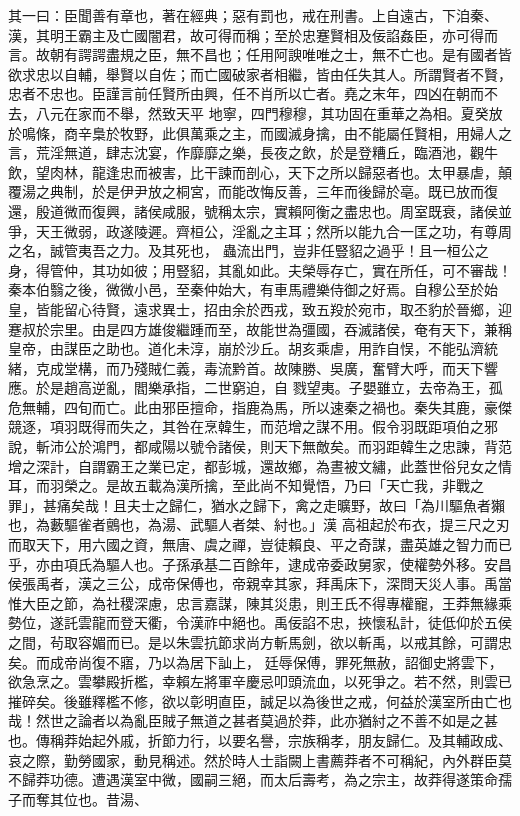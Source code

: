 \begin{pinyinscope}
 其一曰：臣聞善有章也，著在經典；惡有罰也，戒在刑書。上自遠古，下洎秦、漢，其明王霸主及亡國闇君，故可得而稱；至於忠蹇賢相及佞諂姦臣，亦可得而言。故朝有諤諤盡規之臣，無不昌也；任用阿諛唯唯之士，無不亡也。是有國者皆欲求忠以自輔，舉賢以自佐；而亡國破家者相繼，皆由任失其人。所謂賢者不賢，忠者不忠也。臣謹言前任賢所由興，任不肖所以亡者。堯之末年，四凶在朝而不去，八元在家而不舉，然致天平
 地寧，四門穆穆，其功固在重華之為相。夏癸放於鳴條，商辛梟於牧野，此俱萬乘之主，而國滅身擒，由不能屬任賢相，用婦人之言，荒淫無道，肆志沈宴，作靡靡之樂，長夜之飲，於是登糟丘，臨酒池，觀牛飲，望肉林，龍逢忠而被害，比干諫而剖心，天下之所以歸惡者也。太甲暴虐，顛覆湯之典制，於是伊尹放之桐宮，而能改悔反善，三年而後歸於亳。既已放而復還，殷道微而復興，諸侯咸服，號稱太宗，實賴阿衡之盡忠也。周室既衰，諸侯並爭，天王微弱，政遂陵遲。齊桓公，淫亂之主耳；然所以能九合一匡之功，有尊周之名，誠管夷吾之力。及其死也，
 蟲流出門，豈非任豎貂之過乎！且一桓公之身，得管仲，其功如彼；用豎貂，其亂如此。夫榮辱存亡，實在所任，可不審哉！秦本伯翳之後，微微小邑，至秦仲始大，有車馬禮樂侍御之好焉。自穆公至於始皇，皆能留心待賢，遠求異士，招由余於西戎，致五羖於宛市，取丕豹於晉鄉，迎蹇叔於宗里。由是四方雄俊繼踵而至，故能世為彊國，吞滅諸侯，奄有天下，兼稱皇帝，由謀臣之助也。道化未淳，崩於沙丘。胡亥乘虐，用詐自悮，不能弘濟統緒，克成堂構，而乃殘賊仁義，毒流黔首。故陳勝、吳廣，奮臂大呼，而天下響應。於是趙高逆亂，閻樂承指，二世窮迫，自
 戮望夷。子嬰雖立，去帝為王，孤危無輔，四旬而亡。此由邪臣擅命，指鹿為馬，所以速秦之禍也。秦失其鹿，豪傑競逐，項羽既得而失之，其咎在烹韓生，而范增之謀不用。假令羽既距項伯之邪說，斬沛公於鴻門，都咸陽以號令諸侯，則天下無敵矣。而羽距韓生之忠諫，背范增之深計，自謂霸王之業已定，都彭城，還故鄉，為晝被文繡，此蓋世俗兒女之情耳，而羽榮之。是故五載為漢所擒，至此尚不知覺悟，乃曰「天亡我，非戰之罪」，甚痛矣哉！且夫士之歸仁，猶水之歸下，禽之走曠野，故曰「為川驅魚者獺也，為藪驅雀者鸇也，為湯、武驅人者桀、紂也。」漢
 高祖起於布衣，提三尺之刃而取天下，用六國之資，無唐、虞之禪，豈徒賴良、平之奇謀，盡英雄之智力而已乎，亦由項氏為驅人也。子孫承基二百餘年，逮成帝委政舅家，使權勢外移。安昌侯張禹者，漢之三公，成帝保傅也，帝親幸其家，拜禹床下，深問天災人事。禹當惟大臣之節，為社稷深慮，忠言嘉謀，陳其災患，則王氏不得專權寵，王莽無緣乘勢位，遂託雲龍而登天衢，令漢祚中絕也。禹佞諂不忠，挾懷私計，徒低仰於五侯之間，茍取容媚而已。是以朱雲抗節求尚方斬馬劍，欲以斬禹，以戒其餘，可謂忠矣。而成帝尚復不寤，乃以為居下訕上，
 廷辱保傅，罪死無赦，詔御史將雲下，欲急烹之。雲攀殿折檻，幸賴左將軍辛慶忌叩頭流血，以死爭之。若不然，則雲已摧碎矣。後雖釋檻不修，欲以彰明直臣，誠足以為後世之戒，何益於漢室所由亡也哉！然世之論者以為亂臣賊子無道之甚者莫過於莽，此亦猶紂之不善不如是之甚也。傳稱莽始起外戚，折節力行，以要名譽，宗族稱孝，朋友歸仁。及其輔政成、哀之際，勤勞國家，動見稱述。然於時人士詣闕上書薦莽者不可稱紀，內外群臣莫不歸莽功德。遭遇漢室中微，國嗣三絕，而太后壽考，為之宗主，故莽得遂策命孺子而奪其位也。昔湯、

\end{pinyinscope}
